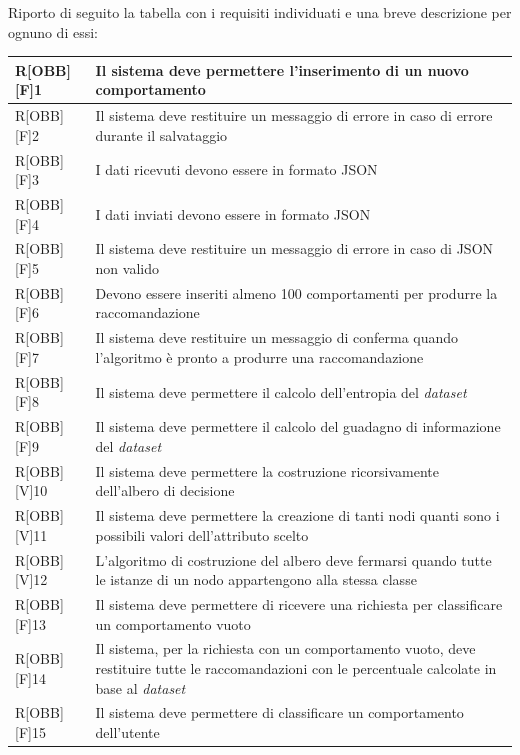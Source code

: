 \newpage
Riporto di seguito la tabella con i requisiti individuati e una breve descrizione per ognuno di essi:
\begin{table}[h]
	\begin{tabular}{|p{}|p{}|}
		\midrule
		R[OBB][F]1 & Il sistema deve permettere l'inserimento di un nuovo comportamento \\ \midrule
		R[OBB][F]2 & Il sistema deve restituire un messaggio di errore in caso di errore durante il salvataggio \\ \midrule
		R[OBB][F]3 & I dati ricevuti devono essere in formato \gls{JSON} \\ \midrule
		R[OBB][F]4 & I dati inviati devono essere in formato \gls{JSON} \\ \midrule
		R[OBB][F]5 & Il sistema deve restituire un messaggio di errore in caso di \gls{JSON} non valido \\ \midrule
		R[OBB][F]6 & Devono essere inseriti almeno 100 comportamenti per produrre la raccomandazione \\ \midrule
		R[OBB][F]7 & Il sistema deve restituire un messaggio di conferma quando l'algoritmo è pronto a produrre una raccomandazione \\ \midrule
		R[OBB][F]8 & Il sistema deve permettere il calcolo dell'entropia del \textit{dataset} \\ \midrule
		R[OBB][F]9 & Il sistema deve permettere il calcolo del guadagno di informazione del \textit{dataset} \\ \midrule
		R[OBB][V]10 & Il sistema deve permettere la costruzione ricorsivamente dell'albero di decisione \\ \midrule
		R[OBB][V]11 & Il sistema deve permettere la creazione di tanti nodi quanti sono i possibili valori dell'attributo scelto \\ \midrule
		R[OBB][V]12 & L'algoritmo di costruzione del albero deve fermarsi quando tutte le istanze di un nodo appartengono alla stessa classe \\ \midrule	
		R[OBB][F]13 & Il sistema deve permettere di ricevere una richiesta per classificare un comportamento vuoto \\ \midrule
		R[OBB][F]14 & Il sistema, per la richiesta con un comportamento vuoto, deve restituire tutte le raccomandazioni con le percentuale calcolate in base al \textit{dataset} \\ \midrule
		R[OBB][F]15 & Il sistema deve permettere di classificare un comportamento dell'utente \\ \midrule
		\bottomrule
		
	\end{tabular}
\end{table}
		
